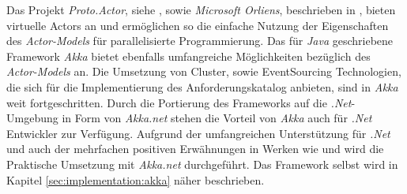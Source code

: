 Das Projekt \textit{Proto.Actor}, siehe \cite{Proto.Actor}, sowie \textit{Microsoft Orliens}, beschrieben in \cite{bykov2011orleans}, bieten virtuelle Actors an und ermöglichen so die einfache Nutzung der Eigenschaften des \textit{Actor-Models} für parallelisierte Programmierung. Das für \textit{Java} geschriebene Framework \textit{Akka} bietet ebenfalls umfangreiche Möglichkeiten bezüglich des \textit{Actor-Models} an. Die Umsetzung von Cluster, sowie EventSourcing Technologien, die sich für die Implementierung des Anforderungskatalog anbieten, sind in \textit{Akka} weit fortgeschritten. Durch die Portierung des Frameworks auf die \textit{.Net}-Umgebung in Form von \textit{Akka.net} stehen die Vorteil von \textit{Akka} auch für \textit{.Net} Entwickler zur Verfügung.
Aufgrund der umfangreichen Unterstützung für \textit{.Net} und auch der mehrfachen positiven Erwähnungen in Werken wie \cite{Vernon2015ReactiveAkka} und \cite{bernhardt2016reactive} wird die Praktische Umsetzung mit \textit{Akka.net} durchgeführt.
 Das Framework selbst wird in Kapitel \ref{sec:implementation:akka} näher beschrieben. 